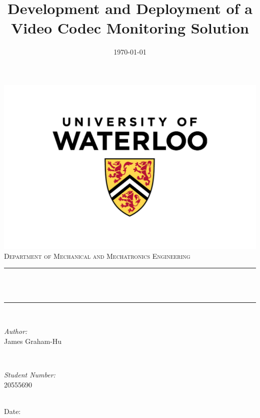 \documentclass[letterpaper,12pt]{article}
\title{Development and Deployment of a Video Codec Monitoring Solution}
\author{}
\date{\today}											%
\makeatletter
\let\thetitle\@title
\let\thedate\@date
\makeatother
\begin{document}
\begin{titlepage}
	\centering
    \vspace*{-1 cm}
    \includegraphics[scale = 0.5]{UW.jpg}\\	%
    \textsc{\Large Department of Mechanical and Mechatronics Engineering}\\[2.0 cm]	
	\rule{\linewidth}{0.2 mm} \\[0.4 cm]
	{ \huge \bfseries \thetitle}\\
	\rule{\linewidth}{0.2 mm} \\[1.5 cm]
	
	\begin{minipage}[t]{0.4\textwidth}
		\begin{flushleft} \large
			\emph{Author:}\\
            James Graham-Hu \\
			\end{flushleft}
			\end{minipage}~
			\begin{minipage}[t]{0.4\textwidth}
			\begin{flushright} \large
			\emph{Student Number:} \\
				20555690 \\
		\end{flushright}
	\end{minipage}\\[2 cm]
	Date: 
	{\large \thedate}\\[2 cm]
	\vfill
	
\end{titlepage}
\thispagestyle{empty}
\thedate\\
\end{document}
